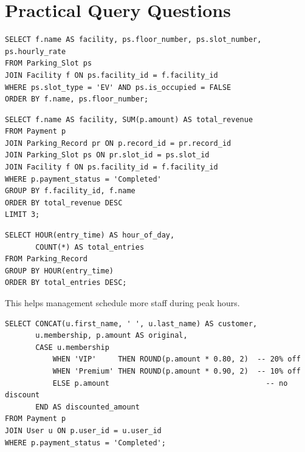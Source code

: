 \documentclass[12pt,a4paper]{article}
\begin{document}
\section{Practical Query Questions}

\begin{questionbox}
\end{questionbox}
\begin{answerbox}
\begin{lstlisting}
SELECT f.name AS facility, ps.floor_number, ps.slot_number, ps.hourly_rate
FROM Parking_Slot ps
JOIN Facility f ON ps.facility_id = f.facility_id
WHERE ps.slot_type = 'EV' AND ps.is_occupied = FALSE
ORDER BY f.name, ps.floor_number;
\end{lstlisting}
\end{answerbox}

\begin{questionbox}
\end{questionbox}
\begin{answerbox}
\begin{lstlisting}
SELECT f.name AS facility, SUM(p.amount) AS total_revenue
FROM Payment p
JOIN Parking_Record pr ON p.record_id = pr.record_id
JOIN Parking_Slot ps ON pr.slot_id = ps.slot_id
JOIN Facility f ON ps.facility_id = f.facility_id
WHERE p.payment_status = 'Completed'
GROUP BY f.facility_id, f.name
ORDER BY total_revenue DESC
LIMIT 3;
\end{lstlisting}
\end{answerbox}

\begin{questionbox}
\end{questionbox}
\begin{answerbox}
\begin{lstlisting}
SELECT HOUR(entry_time) AS hour_of_day,
       COUNT(*) AS total_entries
FROM Parking_Record
GROUP BY HOUR(entry_time)
ORDER BY total_entries DESC;
\end{lstlisting}
This helps management schedule more staff during peak hours.
\end{answerbox}

\begin{questionbox}
\end{questionbox}
\begin{answerbox}
\begin{lstlisting}
SELECT CONCAT(u.first_name, ' ', u.last_name) AS customer,
       u.membership, p.amount AS original,
       CASE u.membership
           WHEN 'VIP'     THEN ROUND(p.amount * 0.80, 2)  -- 20% off
           WHEN 'Premium' THEN ROUND(p.amount * 0.90, 2)  -- 10% off
           ELSE p.amount                                    -- no discount
       END AS discounted_amount
FROM Payment p
JOIN User u ON p.user_id = u.user_id
WHERE p.payment_status = 'Completed';
\end{lstlisting}
\end{answerbox}
\end{document}
